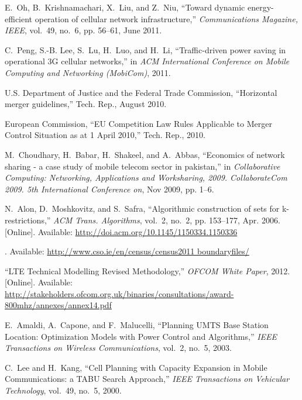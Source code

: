 \documentclass[10pt,journal,cspaper,compsoc]{IEEEtran}
\begin{document}
\begin{thebibliography}{10}
E.~Oh, B.~Krishnamachari, X.~Liu, and Z.~Niu, ``Toward dynamic energy-efficient
  operation of cellular network infrastructure,'' \emph{Communications
  Magazine, IEEE}, vol.~49, no.~6, pp. 56--61, June 2011.

C.~Peng, S.-B. Lee, S.~Lu, H.~Luo, and H.~Li, ``{Traffic-driven power saving in
  operational 3G cellular networks},'' in \emph{ACM International Conference on
  Mobile Computing and Networking (MobiCom)}, 2011.

{U.S. Department of Justice and the Federal Trade Commission}, ``Horizontal
  merger guidelines,'' Tech. Rep., August 2010.

{European Commission}, ``{EU Competition Law Rules Applicable to Merger Control
  Situation as at 1 April 2010},'' Tech. Rep., 2010.

M.~Choudhary, H.~Babar, H.~Shakeel, and A.~Abbas, ``Economics of network
  sharing - a case study of mobile telecom sector in pakistan,'' in
  \emph{Collaborative Computing: Networking, Applications and Worksharing,
  2009. CollaborateCom 2009. 5th International Conference on}, Nov 2009, pp.
  1--6.

\BIBentryALTinterwordspacing
N.~Alon, D.~Moshkovitz, and S.~Safra, ``Algorithmic construction of sets for
  k-restrictions,'' \emph{ACM Trans. Algorithms}, vol.~2, no.~2, pp. 153--177,
  Apr. 2006. [Online]. Available:
  \url{http://doi.acm.org/10.1145/1150334.1150336}
\BIBentrySTDinterwordspacing

\BIBentryALTinterwordspacing
 [Online]. Available: \url{http://www.cso.ie/en/census/census2011
  boundaryfiles/}
\BIBentrySTDinterwordspacing

\BIBentryALTinterwordspacing
``{LTE Technical Modelling Revised Methodology},'' \emph{OFCOM White Paper},
  2012. [Online]. Available:
  \url{http://stakeholders.ofcom.org.uk/binaries/consultations/award-800mhz/annexes/annex14.pdf}
\BIBentrySTDinterwordspacing

E.~Amaldi, A.~Capone, and F.~Malucelli, ``{Planning UMTS Base Station Location:
  Optimization Models with Power Control and Algorithms},'' \emph{IEEE
  Transactions on Wireless Communications}, vol.~2, no.~5, 2003.

C.~Lee and H.~Kang, ``{Cell Planning with Capacity Expansion in Mobile
  Communications: a TABU Search Approach},'' \emph{IEEE Transactions on
  Vehicular Technology}, vol.~49, no.~5, 2000.


\end{thebibliography}
\end{document}
